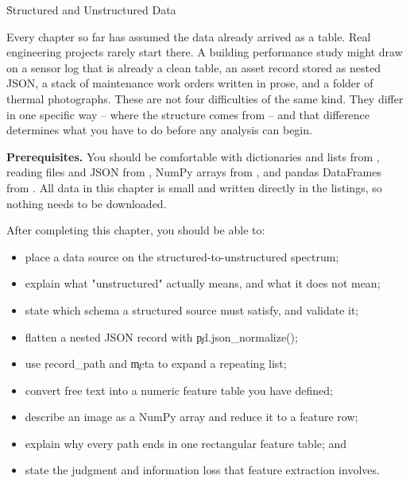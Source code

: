 
\h{Structured and Unstructured Data}
\label{ch:14}

Every chapter so far has assumed the data already arrived as a table. Real
engineering projects rarely start there. A building performance study might
draw on a sensor log that is already a clean table, an asset record stored as
nested JSON, a stack of maintenance work orders written in prose, and a folder
of thermal photographs. These are not four difficulties of the same kind. They
differ in one specific way -- where the structure comes from -- and that
difference determines what you have to do before any analysis can begin.

\begin{NoteBox}
\textbf{Prerequisites.} You should be comfortable with dictionaries and lists
from , reading files and JSON from
, NumPy arrays from
, and pandas DataFrames from
. All data in this chapter is small and written
directly in the listings, so nothing needs to be downloaded.
\end{NoteBox}

\begin{tcolorbox}[title=Learning outcomes,colframe=orange,colback=white,arc=2mm]
After completing this chapter, you should be able to:
\begin{itemize}
    \item place a data source on the structured-to-unstructured spectrum;
    \item explain what "unstructured" actually means, and what it does not mean;
    \item state which schema a structured source must satisfy, and validate it;
    \item flatten a nested JSON record with \c{pd.json_normalize()};
    \item use \c{record_path} and \c{meta} to expand a repeating list;
    \item convert free text into a numeric feature table you have defined;
    \item describe an image as a NumPy array and reduce it to a feature row;
    \item explain why every path ends in one rectangular feature table; and
    \item state the judgment and information loss that feature extraction involves.
\end{itemize}
\end{tcolorbox}

